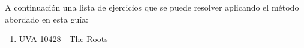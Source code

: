 A continuación una lista de ejercicios que se puede resolver aplicando el método abordado en esta guía:

\begin{enumerate}
	\item \href{https://uva.onlinejudge.org/index.php?option=com_onlinejudge&Itemid=8&category=16&page=show_problem&problem=1369}{UVA 10428 - The Roots}
\end{enumerate}
